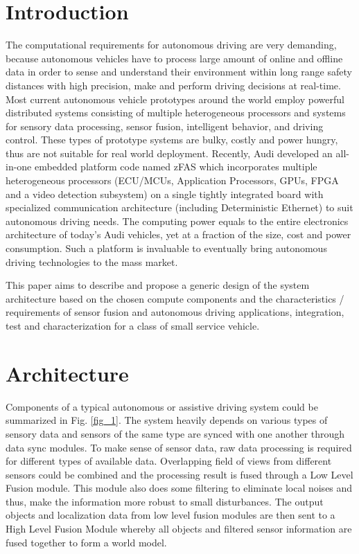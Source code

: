\documentclass[10 pt,letterpaper,conference]{IEEEtran}
\begin{document}
\section{Introduction}\label{introduction}

The computational requirements for autonomous driving are very
demanding, because autonomous vehicles have to process large amount of
online and offline data in order to sense and understand their
environment within long range safety distances with high precision, make
and perform driving decisions at real-time. Most current autonomous
vehicle prototypes around the world employ powerful distributed systems
consisting of multiple heterogeneous processors and systems for sensory
data processing, sensor fusion, intelligent behavior, and driving
control. These types of prototype systems are bulky, costly and power
hungry, thus are not suitable for real world deployment. Recently, Audi
developed an all-in-one embedded platform code named zFAS which
incorporates multiple heterogeneous processors (ECU/MCUs, Application
Processors, GPUs, FPGA and a video detection subsystem) on a single
tightly integrated board with specialized communication architecture
(including Deterministic Ethernet) to suit autonomous driving needs. The
computing power equals to the entire electronics architecture of today's
Audi vehicles, yet at a fraction of the size, cost and power
consumption. Such a platform is invaluable to eventually bring
autonomous driving technologies to the mass market.

This paper aims to describe and propose a generic design of the system
architecture based on the chosen compute components and the
characteristics / requirements of sensor fusion and autonomous driving
applications, integration, test and characterization for a class of
small service vehicle.

\section{Architecture}\label{architecture}

Components of a typical autonomous or assistive driving system could be
summarized in Fig. \ref{fig_1}. The system heavily depends on various
types of sensory data and sensors of the same type are synced with one
another through data sync modules. To make sense of sensor data, raw
data processing is required for different types of available data.
Overlapping field of views from different sensors could be combined and
the processing result is fused through a Low Level Fusion module. This
module also does some filtering to eliminate local noises and thus, make
the information more robust to small disturbances. The output objects
and localization data from low level fusion modules are then sent to a
High Level Fusion Module whereby all objects and filtered sensor
information are fused together to form a world model.
\end{document}
